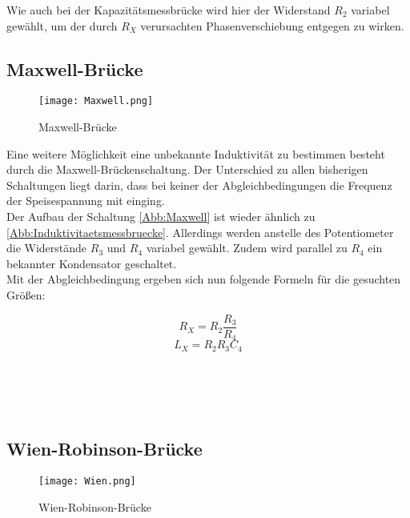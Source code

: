 Wie auch bei der Kapazitätsmessbrücke wird hier der Widerstand $R_2$ variabel gewählt, um der durch $R_X$ verursachten Phasenverschiebung entgegen zu wirken.

\subsection{Maxwell-Brücke}

\begin{figure}
    \centering
    \texttt{[image: Maxwell.png]}
    \caption{Maxwell-Brücke \cite{Blatt}}
    \label{Abb:Maxwell}
\end{figure}

Eine weitere Möglichkeit eine unbekannte Induktivität zu bestimmen besteht durch die Maxwell-Brückenschaltung. Der Unterschied zu allen bisherigen Schaltungen liegt darin,
dass bei keiner der Abgleichbedingungen die Frequenz der Speisespannung mit einging.\\
Der Aufbau der Schaltung \autoref{Abb:Maxwell} ist wieder ähnlich zu \autoref{Abb:Induktivitaetsmessbruecke}. Allerdings werden anstelle des Potentiometer die Widerstände $R_3$ und $R_4$ variabel
gewählt. Zudem wird parallel zu $R_4$ ein bekannter Kondensator geschaltet.\\
Mit der Abgleichbedingung ergeben sich nun folgende Formeln für die gesuchten Größen:

\begin{equation}
    R_X = R_2 \frac{R_3}{R_4} \label{eqn:LCRX}
\end{equation}
\begin{equation}
    L_X = R_2 R_3 C_4 \label{eqn:LLCX}
\end{equation}
\\
\\
\\
\\
\subsection{Wien-Robinson-Brücke}

\begin{figure}
    \centering
    \texttt{[image: Wien.png]}
    \caption{Wien-Robinson-Brücke \cite{Blatt}}
    \label{Abb:Wien}
\end{figure}

